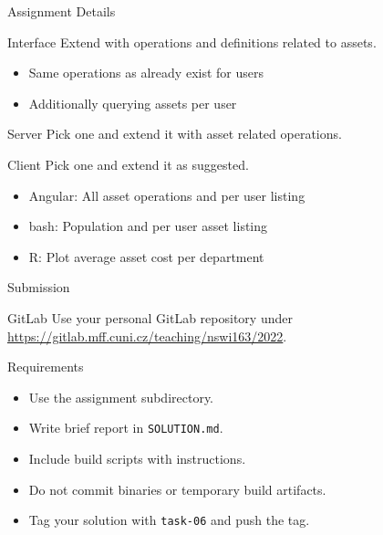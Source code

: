 \begin{frame}{Assignment Details}
    \begin{block}{Interface}
        Extend with operations and definitions related to assets.
        \begin{itemize}
            \item Same operations as already exist for users
            \item Additionally querying assets per user
        \end{itemize}
    \end{block}

    \medskip

    \begin{block}{Server}
        Pick one and extend it with asset related operations.
    \end{block}

    \medskip

    \begin{block}{Client}
        Pick one and extend it as suggested.
        \begin{itemize}
            \item Angular: All asset operations and per user listing
            \item bash: Population and per user asset listing
            \item R: Plot average asset cost per department
        \end{itemize}
    \end{block}
\end{frame}


\begin{frame}{Submission}
    \begin{block}{GitLab}
        Use your personal GitLab repository under \\
        \url{https://gitlab.mff.cuni.cz/teaching/nswi163/2022}.
    \end{block}
    \begin{block}{Requirements}
        \begin{itemize}
            \item Use the assignment subdirectory.
            \item Write brief report in \lstinline{SOLUTION.md}.
            \item Include build scripts with instructions.
            \item Do not commit binaries or temporary build artifacts.
            \item Tag your solution with \lstinline{task-06} and push the tag.
        \end{itemize}
    \end{block}
\end{frame}


